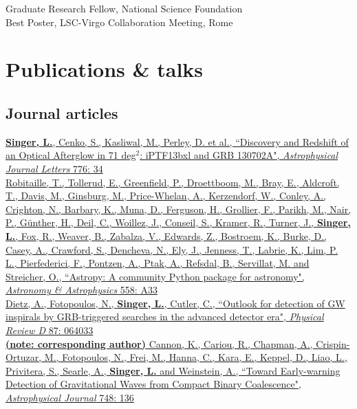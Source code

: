 \documentclass[10pt, letterpaper]{article} %
\newcommand{\years}[1]{\marginnote{\scriptsize #1}} %
\begin{document}
\years{2010--13}Graduate Research Fellow, National Science Foundation\\[0.125cm]
%
\years{2012}Best Poster, LSC-Virgo Collaboration Meeting, Rome

\section*{Publications \& talks}

\subsection*{Journal articles}

\years{2013}\href{http://dx.doi.org/10.1088/2041-8205/776/2/L34}{\textbf{Singer, L.}, Cenko, S., Kasliwal, M., Perley, D. et al., “Discovery and Redshift of an Optical Afterglow in 71 deg$^2$: iPTF13bxl and GRB 130702A", \emph{Astrophysical Journal Letters} 776: 34}\\[0.125cm]
%
\years{2013}\href{http://dx.doi.org/10.1051/0004-6361/201322068}{Robitaille, T., Tollerud, E., Greenfield, P., Droettboom, M., Bray, E., Aldcroft, T., Davis, M., Ginsburg, M., Price-Whelan, A., Kerzendorf, W., Conley, A., Crighton, N., Barbary, K., Muna, D., Ferguson, H., Grollier, F., Parikh, M., Nair, P., Günther, H., Deil, C., Woillez, J., Conseil, S., Kramer, R., Turner, J., \textbf{Singer, L.}, Fox, R., Weaver, B., Zabalza, V., Edwards, Z., Bostroem, K., Burke, D., Casey, A., Crawford, S., Dencheva, N., Ely, J., Jenness, T., Labrie, K., Lim, P. L., Pierfederici, F., Pontzen, A., Ptak, A., Refsdal, B., Servillat, M. and Streicher, O., “Astropy: A community Python package for astronomy", \emph{Astronomy \& Astrophysics} 558: A33}\\[0.125cm]
%
\years{2013}\href{http://dx.doi.org/10.1103/PhysRevD.87.064033}{Dietz, A., Fotopoulos, N., \textbf{Singer, L.}, Cutler, C., “Outlook for detection of GW inspirals by GRB-triggered searches in the advanced detector era", \emph{Physical Review D} 87: 064033}\\[0.125cm]
%
\years{2012}\href{http://dx.doi.org/10.1088/0004-637X/748/2/136}{\textbf{(note: corresponding author)} Cannon, K., Cariou, R., Chapman, A., Crispin-Ortuzar, M., Fotopoulos, N., Frei, M., Hanna, C., Kara, E., Keppel, D., Liao, L., Privitera, S., Searle, A., \textbf{Singer, L.} and Weinstein, A., “Toward Early-warning Detection of Gravitational Waves from Compact Binary Coalescence", \emph{Astrophysical Journal} 748: 136}

\newpage
\end{document}
